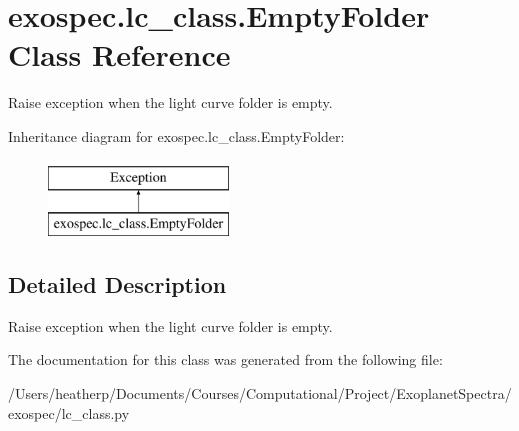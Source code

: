 \hypertarget{classexospec_1_1lc__class_1_1_empty_folder}{}\section{exospec.\+lc\+\_\+class.\+Empty\+Folder Class Reference}
\label{classexospec_1_1lc__class_1_1_empty_folder}


Raise exception when the light curve folder is empty.  


Inheritance diagram for exospec.\+lc\+\_\+class.\+Empty\+Folder\+:\begin{figure}[H]
\begin{center}
\leavevmode
\includegraphics[height=2.000000cm]{classexospec_1_1lc__class_1_1_empty_folder}
\end{center}
\end{figure}


\subsection{Detailed Description}
Raise exception when the light curve folder is empty. 

The documentation for this class was generated from the following file\+:\begin{DoxyCompactItemize}
\item 
/\+Users/heatherp/\+Documents/\+Courses/\+Computational/\+Project/\+Exoplanet\+Spectra/exospec/lc\+\_\+class.\+py\end{DoxyCompactItemize}
